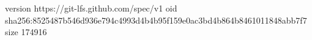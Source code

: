 version https://git-lfs.github.com/spec/v1
oid sha256:8525487b546d936e794c4993d4b4b95f159e0ac3bd4b864b8461011848abb7f7
size 174916

